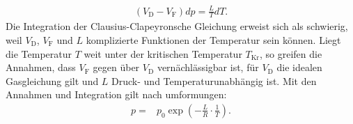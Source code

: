 \begin{align}
(V_\mathrm{D}-V_\mathrm{F})dp=\frac{L}{T}dT\label{eqn:clausius}.
\end{align}
Die Integration der Clausius-Clapeyronsche Gleichung erweist sich als schwierig, weil $V_\mathrm{D}$, $V_\mathrm{F}$ und $L$
komplizierte Funktionen der Temperatur sein können.
Liegt die Temperatur $T$ weit unter der kritischen Temperatur $T_\mathrm{Kr}$, so greifen die Annahmen, dass
$V_\mathrm{F}$ gegen über
$V_\mathrm{D}$ vernächlässigbar ist, für $V_\mathrm{D}$
die idealen Gasgleichung gilt und $L$ Druck- und
Temperaturunabhängig ist.
Mit den Annahmen und Integration gilt nach umformungen:
\begin{align}
  p=&p_\mathrm{0}\exp\left(-\frac{L}{R}\cdot\frac{1}{T}\right)\label{eqn:cceinfach}.\\
\end{align}
